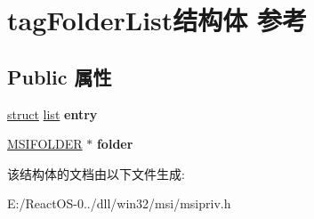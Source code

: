 \hypertarget{structtag_folder_list}{}\section{tag\+Folder\+List结构体 参考}
\label{structtag_folder_list}
\subsection*{Public 属性}
\begin{DoxyCompactItemize}
\item 
\mbox{\label{structtag_folder_list_af6a490650f63f8588808108cc9ccd96b}} 
\hyperlink{interfacestruct}{struct} \hyperlink{classlist}{list} {\bfseries entry}
\item 
\mbox{\label{structtag_folder_list_ae3c5412f0beb92e80f7c0292ccd307f0}} 
\hyperlink{structtag_m_s_i_f_o_l_d_e_r}{M\+S\+I\+F\+O\+L\+D\+ER} $\ast$ {\bfseries folder}
\end{DoxyCompactItemize}


该结构体的文档由以下文件生成\+:\begin{DoxyCompactItemize}
\item 
E\+:/\+React\+O\+S-\/0../dll/win32/msi/msipriv.\+h\end{DoxyCompactItemize}
